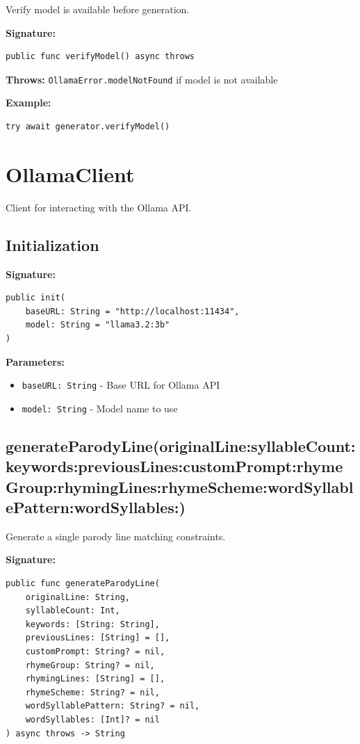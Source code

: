 \documentclass[11pt,a4paper]{article}
\begin{document}
Verify model is available before generation.

\textbf{Signature:}
\begin{lstlisting}
public func verifyModel() async throws
\end{lstlisting}

\textbf{Throws:} \texttt{OllamaError.modelNotFound} if model is not available

\textbf{Example:}
\begin{lstlisting}
try await generator.verifyModel()
\end{lstlisting}

\section{OllamaClient}

Client for interacting with the Ollama API.

\subsection{Initialization}

\textbf{Signature:}
\begin{lstlisting}
public init(
    baseURL: String = "http://localhost:11434",
    model: String = "llama3.2:3b"
)
\end{lstlisting}

\textbf{Parameters:}
\begin{itemize}
    \item \texttt{baseURL: String} - Base URL for Ollama API
    \item \texttt{model: String} - Model name to use
\end{itemize}

\subsection{generateParodyLine(originalLine:syllableCount:keywords:previousLines:customPrompt:rhymeGroup:rhymingLines:rhymeScheme:wordSyllablePattern:wordSyllables:)}

Generate a single parody line matching constraints.

\textbf{Signature:}
\begin{lstlisting}
public func generateParodyLine(
    originalLine: String,
    syllableCount: Int,
    keywords: [String: String],
    previousLines: [String] = [],
    customPrompt: String? = nil,
    rhymeGroup: String? = nil,
    rhymingLines: [String] = [],
    rhymeScheme: String? = nil,
    wordSyllablePattern: String? = nil,
    wordSyllables: [Int]? = nil
) async throws -> String
\end{lstlisting}
\end{document}
